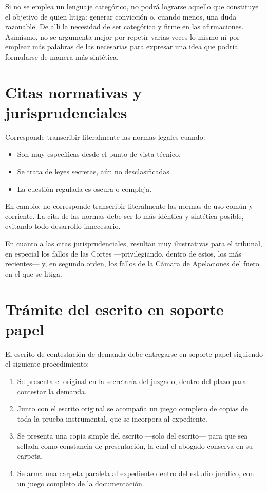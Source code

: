 \documentclass[12pt,oneside]{book}
\begin{document}
\begin{important}
Si no se emplea un lenguaje categórico, no podrá lograrse aquello que constituye el objetivo de quien litiga: generar convicción o, cuando menos, una duda razonable. De allí la necesidad de ser categórico y firme en las afirmaciones. Asimismo, no se argumenta mejor por repetir varias veces lo mismo ni por emplear más palabras de las necesarias para expresar una idea que podría formularse de manera más sintética.
\end{important}

\section{Citas normativas y jurisprudenciales}

Corresponde transcribir literalmente las normas legales cuando:

\begin{itemize}
    \item Son muy específicas desde el punto de vista técnico.
    \item Se trata de leyes secretas, aún no desclasificadas.
    \item La cuestión regulada es oscura o compleja.
\end{itemize}

En cambio, no corresponde transcribir literalmente las normas de uso común y corriente. La cita de las normas debe ser lo más idéntica y sintética posible, evitando todo desarrollo innecesario.

En cuanto a las citas jurisprudenciales, resultan muy ilustrativas para el tribunal, en especial los fallos de las Cortes —privilegiando, dentro de estos, los más recientes— y, en segundo orden, los fallos de la Cámara de Apelaciones del fuero en el que se litiga.

\section{Trámite del escrito en soporte papel}

El escrito de contestación de demanda debe entregarse en soporte papel siguiendo el siguiente procedimiento:

\begin{enumerate}
    \item Se presenta el original en la secretaría del juzgado, dentro del plazo para contestar la demanda.
    \item Junto con el escrito original se acompaña un juego completo de copias de toda la prueba instrumental, que se incorpora al expediente.
    \item Se presenta una copia simple del escrito —solo del escrito— para que sea sellada como constancia de presentación, la cual el abogado conserva en su carpeta.
    \item Se arma una carpeta paralela al expediente dentro del estudio jurídico, con un juego completo de la documentación.
\end{enumerate}
\end{document}
